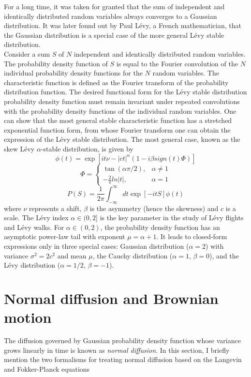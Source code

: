 \documentclass[12pt]{report}
\begin{document}
\begin{justify}
For a long time, it was taken for granted that the sum of independent and identically distributed random variables always converges to a Gaussian distribution. It was later found out by Paul L\'evy, a French mathematician, that the Gaussian distribution is a special case of the more general L\'evy stable distribution.\\

Consider a sum $S$ of $N$ independent and identically distributed random variables. The probability density function of $S$ is equal to the Fourier convolution of the $N$ individual probability density functions for the $N$ random variables. The characteristic function is defined as the Fourier transform of the probability distribution function. The desired functional form for the L\'evy stable distribution probability density function must remain invariant under repeated convolutions with the probability density functions of the individual random variables. One can show that the most general stable characteristic function has a stretched exponential function form, from whose Fourier transform one can obtain the expression of the L\'evy stable distribution. The most general case, known as the skew L\'evy $\alpha$-stable distribution, is given by 
\begin{equation}
\phi(t) = \exp[it \nu - |ct|^\alpha (1 - i\beta sign(t)\Phi) ]
\end{equation}
\begin{equation}
\Phi = 
\begin{cases}
\tan(\alpha \pi/2), & \alpha \neq 1\\
-\frac{2}{\pi} ln|t|, & \alpha = 1
\end{cases}
\end{equation}
\begin{equation}
P(S) = \frac{1}{2 \pi} \int_{-\infty}^{\infty} dt \exp[-itS]\phi(t) 
\end{equation}
where $\nu$ represents a shift, $\beta$ is the asymmetry (hence the skewness) and $c$ is a scale. The L\'evy index $\alpha \in (0, 2]$ is the key parameter in the study of L\'evy flights and L\'evy walks. For $\alpha \in (0, 2)$, the probability density function has an asymptotic power-law tail with exponent $\mu = \alpha + 1$. It leads to closed-form expressions only in three special cases: Gaussian distribution ($\alpha = 2$) with variance $\sigma^2 = 2c^2$ and mean $\mu$, the Cauchy distribution ($\alpha = 1$, $\beta = 0$), and the L\'evy distribution ($\alpha = 1/2$, $\beta = -1$).

\section{Normal diffusion and Brownian motion}
The diffusion governed by Gaussian probability density function whose variance grows linearly in time is known as \textit{normal diffusion}. In this section, I briefly mention the two formalisms for treating normal diffusion based on the Langevin and Fokker-Planck equations\\


\end{justify}
\end{document}
